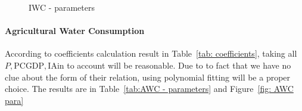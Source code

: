  \begin{figure}[!h]
  \centering
  \caption{IWC - parameters}
  \label{fig: IWC para}
  \end{figure}


  \paragraph{Agricultural Water Consumption}
  According to coefficients calculation result in Table~\ref{tab: coefficients}, taking all $P, \text{PCGDP}, \text{IA}$in to account will be reasonable. Due to to fact that we have no clue about the form of their relation, using polynomial fitting will be a proper choice. The results are in Table~\ref{tab:AWC - parameters} and Figure~\ref{fig: AWC para}

